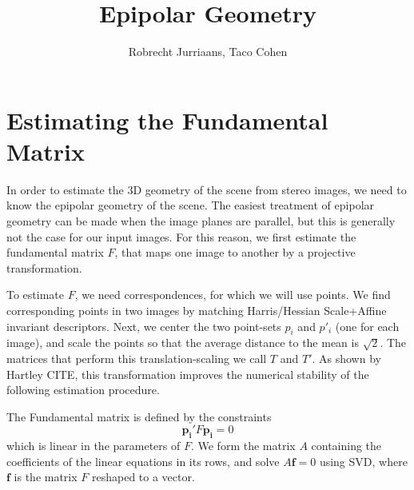 \documentclass[a4paper,10pt]{article}
\title{Epipolar Geometry}
\author{Robrecht Jurriaans, Taco Cohen}
\begin{document}
\maketitle

\section{Estimating the Fundamental Matrix}

In order to estimate the 3D geometry of the scene from stereo images, we need to know the epipolar geometry of the scene.
The easiest treatment of epipolar geometry can be made when the image planes are parallel, but this is generally not the case for our input images.
For this reason, we first estimate the fundamental matrix $F$, that maps one image to another by a projective transformation.

To estimate $F$, we need correspondences, for which we will use points.
We find corresponding points in two images by matching Harris/Hessian Scale+Affine invariant descriptors.
Next, we center the two point-sets ${p_i}$ and ${p'_i}$ (one for each image), and scale the points so that the average distance to the mean is $\sqrt{2}$.
The matrices that perform this translation-scaling we call $T$ and $T'$.
As shown by Hartley CITE, this transformation improves the numerical stability of the following estimation procedure.

The Fundamental matrix is defined by the constraints
\begin{equation}
\mathbf{p_i'} F \mathbf{p_i} = 0
\end{equation}
which is linear in the parameters of $F$.
We form the matrix $A$ containing the coefficients of the linear equations in its rows, and solve $A \mathbf{f} = 0$ using SVD, where $\mathbf{f}$ is the matrix $F$ reshaped to a vector.
\end{document}
